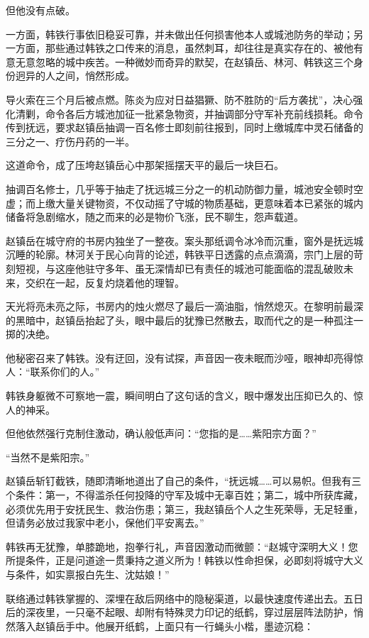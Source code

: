 但他没有点破。

一方面，韩铁行事依旧稳妥可靠，并未做出任何损害他本人或城池防务的举动；另一方面，那些通过韩铁之口传来的消息，虽然刺耳，却往往是真实存在的、被他有意无意忽略的城中疾苦。一种微妙而奇异的默契，在赵镇岳、林河、韩铁这三个身份迥异的人之间，悄然形成。

导火索在三个月后被点燃。陈炎为应对日益猖獗、防不胜防的“后方袭扰”，决心强化清剿，命令各后方城池加征一批紧急物资，并抽调部分守军补充前线损耗。命令传到抚远，要求赵镇岳抽调一百名修士即刻前往报到，同时上缴城库中灵石储备的三分之一、疗伤丹药的一半。

这道命令，成了压垮赵镇岳心中那架摇摆天平的最后一块巨石。

抽调百名修士，几乎等于抽走了抚远城三分之一的机动防御力量，城池安全顿时空虚；而上缴大量关键物资，不仅动摇了守城的物质基础，更意味着本已紧张的城内储备将急剧缩水，随之而来的必是物价飞涨，民不聊生，怨声载道。

赵镇岳在城守府的书房内独坐了一整夜。案头那纸调令冰冷而沉重，窗外是抚远城沉睡的轮廓。林河关于民心向背的论述，韩铁平日透露的点点滴滴，宗门上层的苛刻短视，与这座他驻守多年、虽无深情却已有责任的城池可能面临的混乱破败未来，交织在一起，反复灼烧着他的理智。

天光将亮未亮之际，书房内的烛火燃尽了最后一滴油脂，悄然熄灭。在黎明前最深的黑暗中，赵镇岳抬起了头，眼中最后的犹豫已然散去，取而代之的是一种孤注一掷的决绝。

他秘密召来了韩铁。没有迂回，没有试探，声音因一夜未眠而沙哑，眼神却亮得惊人：“联系你们的人。”

韩铁身躯微不可察地一震，瞬间明白了这句话的含义，眼中爆发出压抑已久的、惊人的神采。

但他依然强行克制住激动，确认般低声问：“您指的是……紫阳宗方面？”

“当然不是紫阳宗。”

赵镇岳斩钉截铁，随即清晰地道出了自己的条件，“抚远城……可以易帜。但我有三个条件：第一，不得滥杀任何投降的守军及城中无辜百姓；第二，城中所获库藏，必须优先用于安抚民生、救治伤患；第三，我赵镇岳个人之生死荣辱，无足轻重，但请务必放过我家中老小，保他们平安离去。”

韩铁再无犹豫，单膝跪地，抱拳行礼，声音因激动而微颤：“赵城守深明大义！您所提条件，正是问道途一贯秉持之道义所为！韩铁以性命担保，必即刻将城守大义与条件，如实禀报白先生、沈姑娘！”

联络通过韩铁掌握的、深埋在敌后网络中的隐秘渠道，以最快速度传递出去。五日后的深夜里，一只毫不起眼、却附有特殊灵力印记的纸鹤，穿过层层阵法防护，悄然落入赵镇岳手中。他展开纸鹤，上面只有一行蝇头小楷，墨迹沉稳：

